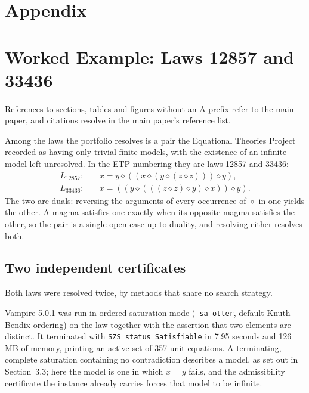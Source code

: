 \documentclass[letterpaper]{article}
\newcommand{\op}{\diamond}
\begin{document}
\appendix

\renewcommand{\thetable}{A\arabic{table}}
\renewcommand{\thefigure}{A\arabic{figure}}
\setcounter{table}{0}
\setcounter{figure}{0}

\section*{Appendix}


\section{Worked Example: Laws 12857 and 33436}
\label{app:worked}

References to sections, tables and figures without an A-prefix refer to the
main paper, and citations resolve in the main paper's reference list.

Among the laws the portfolio resolves is a pair the Equational Theories
Project \citep{bolan2025equational} recorded as having only trivial finite
models, with the existence of an infinite model left unresolved. In the ETP numbering they are laws 12857 and
33436:
\begin{align*}
L_{12857}\colon\quad & x = y \op ((x \op (y \op (z \op z))) \op y), \\
L_{33436}\colon\quad & x = ((y \op (((z \op z) \op y) \op x)) \op y).
\end{align*}
The two are duals: reversing the arguments of every occurrence of $\op$ in one
yields the other. A magma satisfies one exactly when its opposite magma
satisfies the other, so the pair is a single open case up to duality, and
resolving either resolves both.

\subsection{Two independent certificates}

Both laws were resolved twice, by methods that share no search strategy.

Vampire 5.0.1 \citep{kovacs2013first} was run in ordered saturation mode (\texttt{-sa otter}, default
Knuth--Bendix ordering) on the law together with the assertion that two
elements are distinct. It terminated with \texttt{SZS status Satisfiable} in
7.95 seconds and 126\,MB of memory, printing an active set of 357 unit
equations. A terminating, complete saturation containing no contradiction
describes a model, as set out in Section~3.3; here the model is one in which
$x = y$ fails, and the admissibility certificate the instance already carries
forces that model to be infinite.
\end{document}
